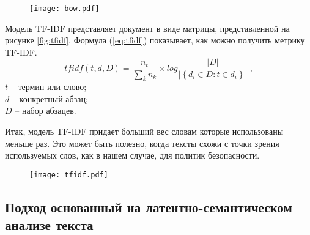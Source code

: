 \documentclass[../main]{subfiles}
\begin{document}
\begin{figure}[H]
    \centering
    {\texttt{[image: bow.pdf]}}
    \vspace{-\baselineskip}
\end{figure}


Модель TF-IDF представляет документ в виде матрицы, представленной на рисунке \ref{fig:tfidf}. Формула (\ref{eq:tfidf}) показывает, как можно получить метрику TF-IDF.
\begin{equation}
    \label{eq:tfidf}
    tfidf(t, d, D) = \frac{n_t}{\displaystyle\sum_k n_k} \times 
    log \frac{ \big|{D}\big| }
    { \big|\left\{ d_i \in D : t \in d_i \right\}\big| }\ ,
\end{equation}
$t$ -- термин или слово;\\
\makebox[1.25cm]{}$d$ -- конкретный абзац;\\
\makebox[1.25cm]{}$D$ -- набор абзацев. 

Итак, модель TF-IDF придает больший вес словам которые использованы меньше раз. Это может быть полезно, когда тексты схожи с точки зрения используемых слов, как в нашем случае, для политик безопасности.

\begin{figure}[H]
    \centering
    {\texttt{[image: tfidf.pdf]}}
    \vspace{-\baselineskip}
\end{figure}

\subsection{Подход основанный на латентно-семантическом анализе текста}
\end{document}
